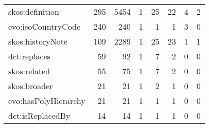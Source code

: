 \documentclass[10pt,a4paper,titlepage,final]{article}
\begin{document}
\begin{longtable}{lrrrrrrr}
        skos:definition &         295 &     5454 &    1 &   25 &   22 &           4 &        2 \\
     evo:isoCountryCode &         240 &      240 &    1 &    1 &    1 &           3 &        0 \\
       skos:historyNote &         109 &     2289 &    1 &   25 &   23 &           1 &        1 \\
           dct:replaces &          59 &       92 &    1 &    7 &    2 &           0 &        0 \\
           skos:related &          55 &       75 &    1 &    7 &    2 &           0 &        0 \\
           skos:broader &          21 &       21 &    1 &    2 &    1 &           0 &        0 \\
   evo:hasPolyHierarchy &          21 &       21 &    1 &    1 &    1 &           0 &        0 \\
       dct:isReplacedBy &          14 &       14 &    1 &    1 &    1 &           0 &        0 \\
\end{longtable}
\end{document}
